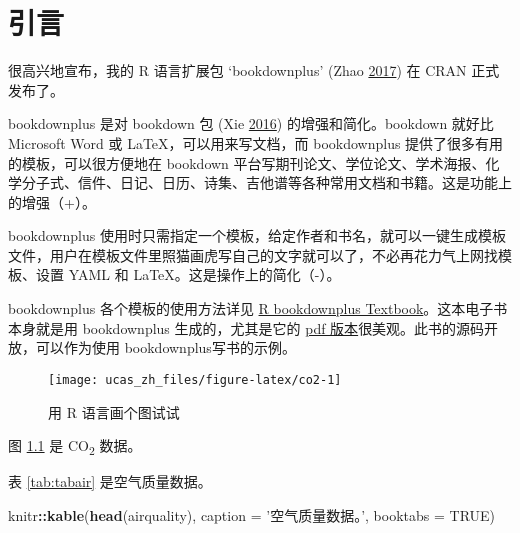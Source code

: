 \documentclass[doublesided]{Style/ucasthesis}%
\newenvironment{Shaded}{\begin{snugshade}}{\end{snugshade}}
\newcommand{\KeywordTok}[1]{\textcolor[rgb]{0.13,0.29,0.53}{\textbf{{#1}}}}
\newcommand{\DataTypeTok}[1]{\textcolor[rgb]{0.13,0.29,0.53}{{#1}}}
\newcommand{\StringTok}[1]{\textcolor[rgb]{0.31,0.60,0.02}{{#1}}}
\newcommand{\OtherTok}[1]{\textcolor[rgb]{0.56,0.35,0.01}{{#1}}}
\newcommand{\OperatorTok}[1]{\textcolor[rgb]{0.81,0.36,0.00}{\textbf{{#1}}}}
\newcommand{\NormalTok}[1]{{#1}}
\begin{document}
{%
\linespread{1.2}%
\tableofcontents%
\listoffigures%
\listoftables%
}
\mainmatter%
\mainmatter

\hypertarget{section}{%
\chapter{引言}\label{section}}

很高兴地宣布，我的 R 语言扩展包 `bookdownplus' (Zhao \protect\hyperlink{ref-R-bookdownplus}{2017}) 在 CRAN 正式发布了。

bookdownplus 是对 bookdown 包 (Xie \protect\hyperlink{ref-R-bookdown}{2016}) 的增强和简化。bookdown 就好比 Microsoft Word 或 LaTeX，可以用来写文档，而 bookdownplus 提供了很多有用的模板，可以很方便地在 bookdown 平台写期刊论文、学位论文、学术海报、化学分子式、信件、日记、日历、诗集、吉他谱等各种常用文档和书籍。这是功能上的增强（+）。

bookdownplus 使用时只需指定一个模板，给定作者和书名，就可以一键生成模板文件，用户在模板文件里照猫画虎写自己的文字就可以了，不必再花力气上网找模板、设置 YAML 和 LaTeX。这是操作上的简化（-）。

bookdownplus 各个模板的使用方法详见 \href{https://bookdown.org/baydap/bookdownplus}{R bookdownplus Textbook}。这本电子书本身就是用 bookdownplus 生成的，尤其是它的 \href{https://bookdown.org/baydap/bookdownplus/bookdownplus.pdf}{pdf 版本}很美观。此书的源码开放，可以作为使用 bookdownplus写书的示例。

\begin{figure}

{\centering \texttt{[image: ucas\_zh\_files/figure-latex/co2-1]} 

}

\caption{用 R 语言画个图试试}\label{fig:co2}
\end{figure}

图 \ref{fig:co2} 是 CO\textsubscript{2} 数据。

表 \ref{tab:tabair} 是空气质量数据。

\begin{Shaded}
\begin{Highlighting}[]
\NormalTok{knitr}\OperatorTok{::}\KeywordTok{kable}\NormalTok{(}\KeywordTok{head}\NormalTok{(airquality), }\DataTypeTok{caption =} \StringTok{'空气质量数据。'}\NormalTok{,}
                   \DataTypeTok{booktabs =} \OtherTok{TRUE}\NormalTok{)}
\end{Highlighting}
\end{Shaded}
\end{document}
